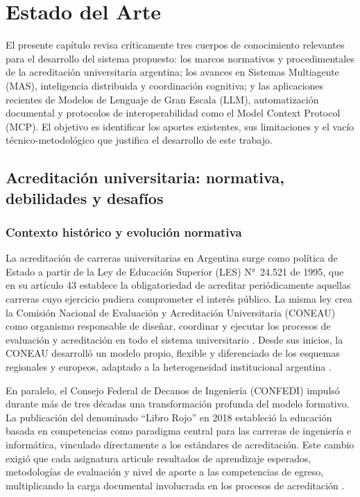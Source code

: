 \chapter{Estado del Arte}
\label{ch:estado_del_arte}

El presente capítulo revisa críticamente tres cuerpos de conocimiento relevantes para el desarrollo del sistema propuesto: los marcos normativos y procedimentales de la acreditación universitaria argentina; los avances en Sistemas Multiagente (MAS), inteligencia distribuida y coordinación cognitiva; y las aplicaciones recientes de Modelos de Lenguaje de Gran Escala (LLM), automatización documental y protocolos de interoperabilidad como el Model Context Protocol (MCP). El objetivo es identificar los aportes existentes, sus limitaciones y el vacío técnico-metodológico que justifica el desarrollo de este trabajo.

\section{Acreditación universitaria: normativa, debilidades y desafíos}
\label{sec:eda_acreditacion}

\subsection{Contexto histórico y evolución normativa}

La acreditación de carreras universitarias en Argentina surge como política de Estado a partir de la Ley de Educación Superior (LES) N°~24.521 de 1995, que en su artículo 43 establece la obligatoriedad de acreditar periódicamente aquellas carreras cuyo ejercicio pudiera comprometer el interés público. La misma ley crea la Comisión Nacional de Evaluación y Acreditación Universitaria (CONEAU) como organismo responsable de diseñar, coordinar y ejecutar los procesos de evaluación y acreditación en todo el sistema universitario \citep{marquina2022implicancias}. Desde sus inicios, la CONEAU desarrolló un modelo propio, flexible y diferenciado de los esquemas regionales y europeos, adaptado a la heterogeneidad institucional argentina \citep{greiner2023plan}.

En paralelo, el Consejo Federal de Decanos de Ingeniería (CONFEDI) impulsó durante más de tres décadas una transformación profunda del modelo formativo. La publicación del denominado ``Libro Rojo'' en 2018 estableció la educación basada en competencias como paradigma central para las carreras de ingeniería e informática, vinculado directamente a los estándares de acreditación. Este cambio exigió que cada asignatura articule resultados de aprendizaje esperados, metodologías de evaluación y nivel de aporte a las competencias de egreso, multiplicando la carga documental involucrada en los procesos de acreditación \citep{sanchez2022acreditacion, greiner2023plan}.

